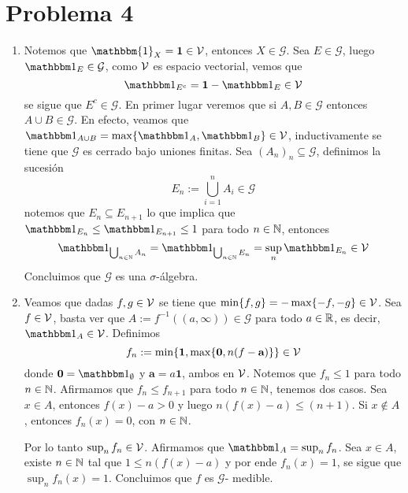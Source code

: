 \documentclass{article}
\begin{document}
\section*{Problema 4}
\begin{enumerate}
    \item Notemos que $\mathbbm{1}_{X}=\textbf{1}\in\V$, entonces $X\in\mathcal{G}$. Sea 
    $E\in\mathcal{G}$, luego $\I_{E}\in\mathcal{G}$, como $\mathcal{V}$ es espacio vectorial, vemos que
    \begin{equation*}
        \I_{E^{c}}=\textbf{1}-\I_{E}\in\V
    \end{equation*}
    se sigue que $E^{c}\in\mathcal{G}$. En primer lugar veremos que si $A,B\in\mathcal{G}$ entonces
    $A\cup B\in\mathcal{G}$. En efecto, veamos que $\I_{A\cup B}=\max\{\I_{A},\I_{B}\}\in\V$,
    inductivamente se tiene que $\mathcal{G}$ es cerrado bajo uniones finitas. Sea $(A_{n})_{n}
    \subseteq\mathcal{G}$, definimos la sucesión
    \begin{equation*}
        E_{n}:=\bigcup_{i=1}^{n}A_{i}\in\mathcal{G}
    \end{equation*}
    notemos que $E_{n}\subseteq E_{n+1}$ lo que implica que $\I_{E_{n}}\leq\I_{E_{n+1}}\leq1$ para
    todo $n\in\mathbb{N}$, entonces
    \begin{equation*}
        \I_{\bigcup_{n\in\N}A_{n}}=\I_{\bigcup_{n\in\N}E_{n}}=\sup_{n}\I_{E_{n}}\in\V
    \end{equation*}
    Concluimos que $\mathcal{G}$ es una $\sigma$-álgebra.

    \item Veamos que dadas $f,g\in\mathcal{V}$ se tiene que $\min\{f,g\}=-\max\{-f,-g\}\in\mathcal{V}$. 
    Sea $f\in\mathcal{V}$, basta ver que $A:=f^{-1}((a,\infty))\in\mathcal{G}$ para todo $a\in\mathbb{R}$, es decir,
    $\I_{A}\in\V$. Definimos
    \begin{equation*}
        f_{n}:=\min\{\textbf{1},\max\{\textbf{0},n(f-\textbf{a})\}\}\in\mathcal{V}
    \end{equation*}
    donde $\textbf{0}=\I_{\emptyset}$ y $\textbf{a}=a\textbf{1}$, ambos en $\mathcal{V}$. Notemos que 
    $f_{n}\leq1$ para todo $n\in\mathbb{N}$. Afirmamos que $f_{n}\leq f_{n+1}$ para todo $n\in\mathbb{N}$, tenemos
    dos casos. Sea $x\in A$, entonces $f(x)-a>0$ y luego $n(f(x)-a)\leq(n+1)$. Si 
    $x\not\in A$, entonces $f_{n}(x)=0$, con $n\in\mathbb{N}$.

    Por lo tanto $\sup_{n}f_{n}\in\mathcal{V}$. Afirmamos que $\I_{A}=\sup_{n}f_{n}$. Sea $x\in A$, existe 
    $n\in\mathbb{N}$ tal que $1\leq n(f(x)-a)$ y por ende $f_{n}(x)=1$, se sigue que $\sup_{n}f_{n}(x)=1$. Concluimos que $f$ es $\mathcal{G}$-
    medible.


\end{enumerate}
\end{document}
